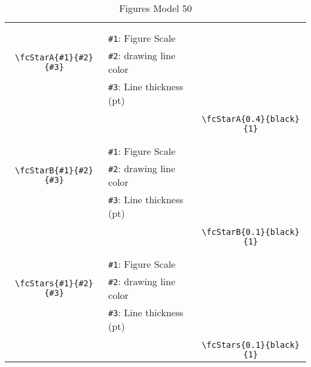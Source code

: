 \documentclass[x11names]{article}
\begin{document}
\begin{table}[H]
\begin{tabular}{|c|l|c|}
	&&\multirow{5}{*}{\fcStarA{0.4}{black}{1}}\\	&&\\	&\verb|#1|: Figure Scale &\\	\verb|\fcStarA{#1}{#2}{#3}|&	\verb|#2|: drawing line color &\\	&\verb|#3|: Line thickness (pt) &\\ &&\\&&	\verb|\fcStarA{0.4}{black}{1}|\\\hline 	
	&&\multirow{5}{*}{\fcStarB{0.1}{black}{1}}\\	&&\\	&\verb|#1|: Figure Scale &\\	\verb|\fcStarB{#1}{#2}{#3}|&	\verb|#2|: drawing line color &\\	&\verb|#3|: Line thickness (pt) &\\ &&\\&&	\verb|\fcStarB{0.1}{black}{1}|\\\hline 	
	&&\multirow{5}{*}{\fcStars{0.1}{black}{1}}\\	&&\\	&\verb|#1|: Figure Scale &\\	\verb|\fcStars{#1}{#2}{#3}|&	\verb|#2|: drawing line color &\\	&\verb|#3|: Line thickness (pt) &\\ &&\\&&	\verb|\fcStars{0.1}{black}{1}|\\\hline 	\hline\end{tabular}\caption{Figures Model 50}\label{tab50}\end{table}
\end{document}
